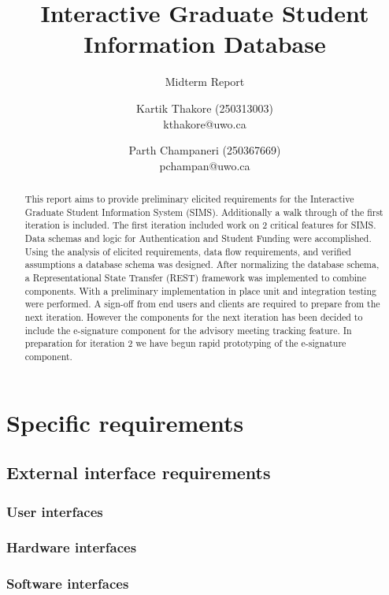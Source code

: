 \documentclass{journal}
\begin{document}

\nocite{*}
\title{Interactive Graduate Student Information Database}
\subtitle{Midterm Report} 
\author{Kartik Thakore (250313003)\\kthakore@uwo.ca \and Parth Champaneri (250367669)\\pchampan@uwo.ca}
\maketitle

\begin{abstract}
This report aims to provide preliminary elicited requirements for the Interactive Graduate Student Information System (SIMS). Additionally a walk through of the first iteration is included. The first iteration included work on 2 critical features for SIMS. Data schemas and logic for Authentication and Student Funding were accomplished. Using the analysis of elicited requirements, data flow requirements, and verified assumptions a database schema was designed. After normalizing the database schema, a Representational State Transfer (REST) framework was implemented to combine components. With a preliminary implementation in place unit and integration testing were performed. A sign-off from end users and clients are required to prepare from the next iteration. However the components for the next iteration has been decided to include the e-signature component for the advisory meeting tracking feature. In preparation for iteration 2 we have begun rapid prototyping of the e-signature component.\end{abstract}

\section{Specific requirements}
\subsection{External interface requirements}
\subsubsection{User interfaces}
\subsubsection{Hardware interfaces}
\subsubsection{Software interfaces}
\end{document}
